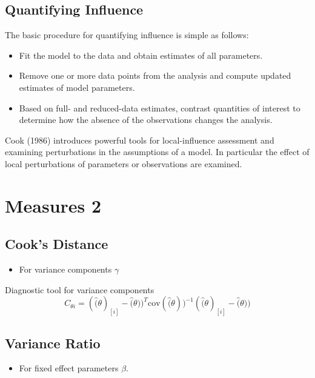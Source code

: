 \documentclass[Main.tex]{subfiles}
\begin{document}
	

	\subsection{Quantifying Influence}  %
	
	The basic procedure for quantifying influence is simple as follows:
	
	\begin{itemize}
		\item Fit the model to the data and obtain estimates of all parameters.
		\item Remove one or more data points from the analysis and compute updated estimates of model parameters.
		\item Based on full- and reduced-data estimates, contrast quantities of interest to determine how the absence of the observations changes the analysis.
	\end{itemize}
	
	Cook (1986) introduces powerful tools for local-influence assessment and examining perturbations in the assumptions of a model. In particular the effect of local perturbations of parameters or observations are examined.
	
	\newpage
	\section{Measures 2} %
	
	\subsection{Cook's Distance} %
	\begin{itemize}
		\item For variance components $\gamma$
	\end{itemize}
	
	Diagnostic tool for variance components
	\[ C_{\theta i} =(\hat(\theta)_{[i]} - \hat(\theta))^{T}\mbox{cov}( \hat(\theta))^{-1}(\hat(\theta)_{[i]} - \hat(\theta))\]
	
	
	\subsection{Variance Ratio} %
	\begin{itemize}
		\item For fixed effect parameters $\beta$.
	\end{itemize}
	
\end{document}

